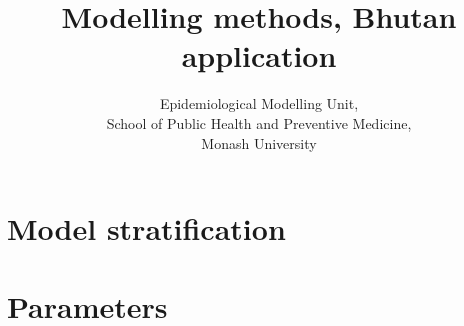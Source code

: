 \documentclass{article}
\author{
    Epidemiological Modelling Unit,
    \\ School of Public Health and Preventive Medicine,
    \\ Monash University
}
\title{Modelling methods, Bhutan application}
\begin{document}
\maketitle
\tableofcontents
\newpage


\section{Model stratification}




\section{Parameters}


\newpage
\printbibliography
\end{document}
